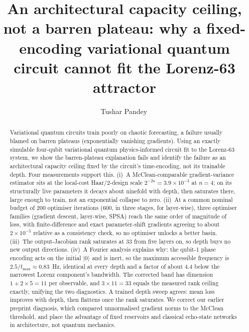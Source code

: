 \documentclass[a4paper,12pt]{iopart}
\providecommand{\MLST}{Mach.\ Learn.: Sci.\ Technol.}
\begin{document}
\title[Capacity ceiling, not barren plateau]
      {An architectural capacity ceiling, not a barren plateau:
       why a fixed-encoding variational quantum circuit cannot fit the
       Lorenz-63 attractor}

\author{Tushar Pandey\,}

\address{Texas A\&M University, College Station, TX 77843, USA}


\submitto{\MLST}

\begin{abstract}
Variational quantum circuits train poorly on chaotic forecasting, a failure
usually blamed on barren plateaus (exponentially vanishing gradients). Using an
exactly simulable four-qubit variational quantum physics-informed circuit fit to
the Lorenz-63 system, we show the barren-plateau explanation fails and identify
the failure as an architectural capacity ceiling fixed by the circuit's
time-encoding, not its trainable depth. Four measurements support this. (i)~A
McClean-comparable gradient-variance estimator sits at the local-cost
Haar/2-design scale $2^{-2n}=3.9\times10^{-3}$ at $n=4$; on its structurally live
parameters it decays about ninefold with depth, then saturates there, large
enough to train, not an exponential collapse to zero. (ii)~At a common nominal
budget of $200$ optimiser iterations ($600$, in three stages, for layer-wise),
three optimiser families (gradient descent, layer-wise, SPSA) reach the same
order of magnitude of loss, with finite-difference and exact parameter-shift
gradients agreeing to about $2\times10^{-5}$ relative as a consistency check, so
no optimiser unlocks a better basin. (iii)~The output-Jacobian rank saturates at
$33$ from five layers on, so depth buys no new output directions. (iv)~A Fourier
analysis explains why: the qubit-1 phase encoding acts on the initial
$|0\rangle$ and is inert, so the maximum accessible frequency is
$2.5/t_{\max}\approx0.83$~Hz, identical at every depth and a factor of about
$4.4$ below the narrowest Lorenz component's bandwidth. The corrected band has
dimension $1+2\times5=11$ per observable, and $3\times11=33$ equals the measured
rank ceiling exactly, unifying the two diagnostics. A trained depth sweep
agrees: mean loss improves with depth, then flattens once the rank saturates. We
correct our earlier preprint diagnosis, which compared unnormalised gradient
norms to the McClean threshold, and place the advantage of fixed reservoirs and
classical echo-state networks in architecture, not quantum mechanics.
\end{abstract}
\end{document}

